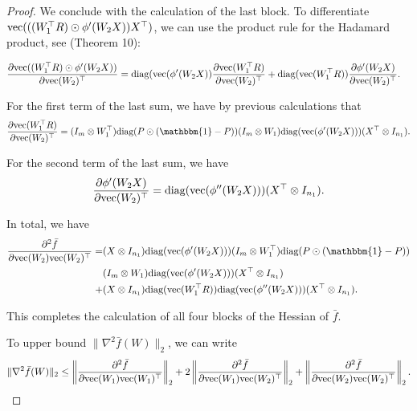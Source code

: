 \documentclass[a4paper,11pt]{article}
\newcommand{\1}{\mathbbm{1}}
\theoremstyle{plain}
\begin{document}
\begin{proof}
We conclude with the calculation of the last block.
To differentiate $\textnormal{vec}(((W_1^\top R) \odot \phi'(W_2 X)) X^\top)$, we can use the product rule for the Hadamard product, see \cite{magnus1985matrix} (Theorem 10):

\begin{align*}
    &\frac{\partial\textnormal{vec}((W_1^\top R) \odot \phi'(W_2 X))}{\partial \text{vec}(W_2)^\top} =  \textnormal{diag}(\text{vec}(\phi'(W_2 X)) \frac{\partial \text{vec}(W_1^\top R)}{\partial \text{vec}(W_2)^\top} + \textnormal{diag}(\textnormal{vec}(W_1^\top R)) \frac{\partial \phi'(W_2 X)}{\partial \text{vec}(W_2)^\top}.
\end{align*}

For the first term of the last sum, we have by previous calculations that
\begin{equation*}
    \frac{\partial \text{vec}(W_1^\top R)}{\partial \text{vec}(W_2)^\top} = (I_m \otimes W_1^\top) \textnormal{diag}(P \odot (\1-P)) (I_m \otimes W_1) \textnormal{diag}(\textnormal{vec}(\phi'(W_2 X))) (X^\top \otimes I_{n_1}).
\end{equation*}

For the second term of the last sum, we have
\begin{equation*}
    \frac{\partial \phi'(W_2 X)}{\partial \text{vec}(W_2)^\top} = \textnormal{diag}(\text{vec}(\phi''(W_2 X))) (X^\top \otimes I_{n_1}).
\end{equation*}

In total, we have
\begin{align*}
    \frac{\partial^2 \bar f}{\partial \textnormal{vec}(W_2) \text{vec}(W_2)^\top} =& (X \otimes I_{n_1}) \textnormal{diag}(\textnormal{vec}(\phi'(W_2 X))) (I_m \otimes W_1^\top) \textnormal{diag}(P \odot (\1-P)) \\ & (I_m \otimes W_1) \textnormal{diag}(\textnormal{vec}(\phi'(W_2 X))) (X^\top \otimes I_{n_1}) \\  + & (X \otimes I_{n_1}) \textnormal{diag}(\textnormal{vec}(W_1^\top R))\textnormal{diag}(\text{vec}(\phi''(W_2 X))) (X^\top \otimes I_{n_1}).
\end{align*}

This completes the calculation of all four blocks of the Hessian of $\bar f$.

To upper bound $\| \nabla^2 \bar f(W) \|_2$, we can write
\begin{equation*}
    \| \nabla^2 \bar f(W) \|_2 \leq \left\|\frac{\partial^2 \bar f}{\partial \textnormal{vec}(W_1) \textnormal{vec}(W_1)^\top } \right\|_2 + 2 \left\|\frac{\partial^2 \bar f}{\partial \textnormal{vec}(W_1) \textnormal{vec}(W_2)^\top } \right\|_2 + \left\|\frac{\partial^2 \bar f}{\partial \textnormal{vec}(W_2) \textnormal{vec}(W_2)^\top } \right\|_2. 
\end{equation*}


\end{proof}
\end{document}
